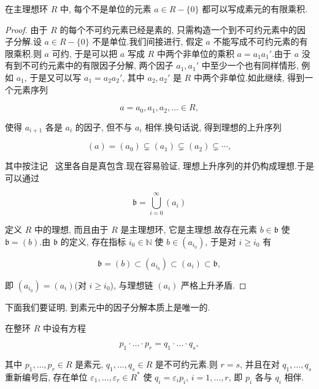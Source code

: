 \begin{corollary}\label{cor:5.2.13}
在主理想环 $R$ 中, 每个不是单位的元素 $a \in R - \{0\}$ 都可以写成素元的有限乘积.
\end{corollary}

\begin{proof}
由于 $R$ 的每个不可约元素已经是素的, 只需构造一个到不可约元素中的因子分解.设 $a \in R - \{0\}$ 不是单位.我们间接进行, 假定 $a$ 不能写成不可约元素的有限乘积.则 $a$ 可约, 于是可以把 $a$ 写成 $R$ 中两个非单位的乘积 $a = a_1 a_1'$.由于 $a$ 没有到不可约元素中的有限因子分解, 两个因子 $a_1, a_1'$ 中至少一个也有同样情形, 例如 $a_1$, 于是又可以写 $a_1 = a_2 a_2'$, 其中 $a_2, a_2'$ 是 $R$ 中两个非单位.如此继续, 得到一个元素序列

\[
a = a_0, a_1, a_2, \ldots \in R,
\]

使得 $a_{i + 1}$ 各是 $a_i$ 的因子, 但不与 $a_i$ 相伴.换句话说, 得到理想的上升序列

\[
(a) = (a_0) \subsetneq (a_1) \subsetneq (a_2) \subsetneq \cdots,
\]

其中按注记~ 这里各自是真包含.现在容易验证, 理想上升序列的并仍构成理想.于是可以通过

\[
\mathfrak{b} = \bigcup_{i = 0}^{\infty} (a_i)
\]

定义 $R$ 中的理想, 而且由于 $R$ 是主理想环, 它是主理想.故存在元素 $b \in \mathfrak{b}$ 使 $\mathfrak{b} = (b)$.由 $\mathfrak{b}$ 的定义, 存在指标 $i_0 \in \mathbb{N}$ 使 $b \in (a_{i_0})$, 于是对 $i \geq i_0$ 有

\[
\mathfrak{b} = (b) \subset (a_{i_0}) \subset (a_i) \subset \mathfrak{b},
\]

即 $(a_{i_0}) = (a_i)$(对 $i \geq i_0$), 与理想链 $(a_i)$ 严格上升矛盾.
\end{proof}

下面我们要证明, 到素元中的因子分解本质上是唯一的.

\begin{lemma}\label{lem:5.2.14}
在整环 $R$ 中设有方程

\[
p_1 \cdot \ldots \cdot p_r = q_1 \cdot \ldots \cdot q_s,
\]

其中 $p_1, \ldots, p_r \in R$ 是素元, $q_1, \ldots, q_s \in R$ 是不可约元素.则 $r = s$, 并且在对 $q_1, \ldots, q_s$ 重新编号后, 存在单位 $\varepsilon_1, \ldots, \varepsilon_r \in R^*$ 使 $q_i = \varepsilon_i p_i$, $i = 1, \ldots, r$, 即 $p_i$ 各与 $q_i$ 相伴.
\end{lemma}


